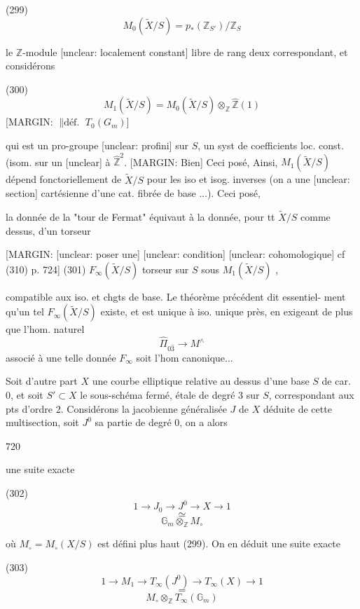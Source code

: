 (299) $$M_0(\tilde{X}/S) = p_*(\mathbb{Z}_{S'})/\mathbb{Z}_S$$

le $\mathbb{Z}$-module [unclear: localement constant] libre
de rang deux correspondant, et
considérons

(300) $$M_1(\tilde{X}/S) = M_0(\tilde{X}/S) \otimes_{\mathbb{Z}} \hat{\mathbb{Z}}(1)$$
[MARGIN: $\| \text{déf.}$ $T_0(G_m)$]

qui est un pro-groupe [unclear: profini] sur $S$,
un syst de coefficients loc. const.
(isom. sur un [unclear] à $\hat{\mathbb{Z}}^2$. [MARGIN: Bien] Ceci posé,
Ainsi, $M_1(\tilde{X}/S)$ dépend fonctoriellement
de $\tilde{X}/S$ pour les iso et isog. inverses
(on a une [unclear: section] cartésienne d'une
cat. fibrée de base ...). Ceci posé,

\newpage


la donnée de la "tour de Fermat"
équivaut à la donnée, pour tt $\tilde{X}/S$
comme dessus, d'un torseur

[MARGIN: [unclear: poser une] [unclear: condition] [unclear: cohomologique] cf (310) p. 724]
(301) $F_{\infty}(\tilde{X}/S)$ torseur sur $S$ sous $M_1(\tilde{X}/S)$ ,

compatible aux iso. et chgts de base.
Le théorème précédent dit essentiel-
ment qu'un tel $F_{\infty}(\tilde{X}/S)$ existe,
et est unique à iso. unique près,
en exigeant de plus que l'hom.
naturel
$$\hat{\Pi}_{0\hat{3}} \longrightarrow M^{\wedge}$$
associé à une telle donnée $F_{\infty}$ soit
l'hom canonique...

Soit d'autre part $X$ une courbe
elliptique relative au dessus d'une
base $S$ de car. $0$, et soit $S' \subset X$ le
sous-schéma fermé, étale de degré $3$ sur $S$,
correspondant aux pts d'ordre $2$. Considérons
la jacobienne généralisée $J$ de $X$
déduite de cette multisection, soit
$J^0$ sa partie de degré $0$, on a alors

\newpage


720

une suite exacte

(302) $$1 \to J_0 \to J^0 \to X \to 1$$
$$\simeq$$
$$\mathbb{G}_m \otimes_{\mathbb{Z}} M_\circ$$

où $M_\circ = M_\circ(X/S)$ est défini plus haut
(299). On en déduit une suite
exacte

(303) $$1 \to M_1 \to T_\infty(J^0) \to T_\infty(X) \to 1$$
$$=$$
$$M_\circ \otimes_{\mathbb{Z}} T_\infty(\mathbb{G}_m)$$

